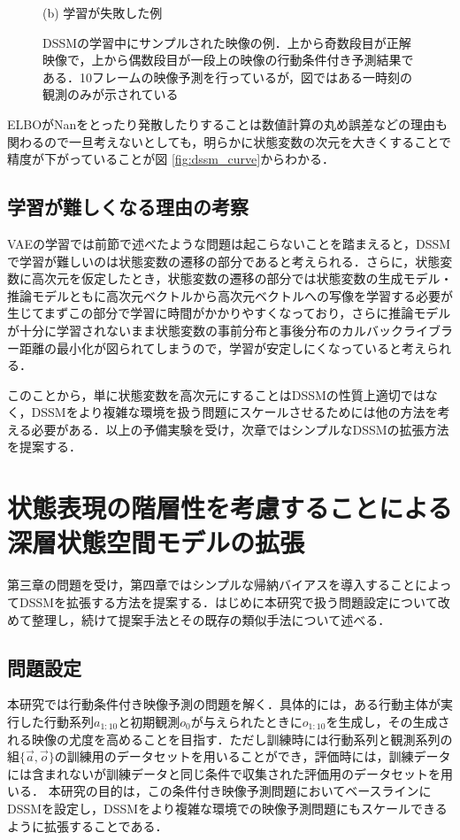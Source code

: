 \documentclass[10pt, twocolumn]{jarticle}
\begin{document}
\begin{figure}[tp]
\begin{minipage}{0.48\hsize}
\begin{center}
      \caption{(b) 学習が失敗した例}
    \end{center}
  \end{minipage}
  \label{fig:dssm_base}
  \caption[DSSMの学習中にサンプルされた映像の例]{DSSMの学習中にサンプルされた映像の例．上から奇数段目が正解映像で，上から偶数段目が一段上の映像の行動条件付き予測結果である．10フレームの映像予測を行っているが，図ではある一時刻の観測のみが示されている}
\end{figure}

ELBOがNanをとったり発散したりすることは数値計算の丸め誤差などの理由も関わるので一旦考えないとしても，明らかに状態変数の次元を大きくすることで精度が下がっていることが図 \ref{fig:dssm_curve}からわかる．

\subsection{学習が難しくなる理由の考察}
VAEの学習では前節で述べたような問題は起こらないことを踏まえると，DSSMで学習が難しいのは状態変数の遷移の部分であると考えられる．さらに，状態変数に高次元を仮定したとき，状態変数の遷移の部分では状態変数の生成モデル・推論モデルともに高次元ベクトルから高次元ベクトルへの写像を学習する必要が生じてまずこの部分で学習に時間がかかりやすくなっており，さらに推論モデルが十分に学習されないまま状態変数の事前分布と事後分布のカルバックライブラー距離の最小化が図られてしまうので，学習が安定しにくなっていると考えられる．

このことから，単に状態変数を高次元にすることはDSSMの性質上適切ではなく，DSSMをより複雑な環境を扱う問題にスケールさせるためには他の方法を考える必要がある．以上の予備実験を受け，次章ではシンプルなDSSMの拡張方法を提案する．

\section{状態表現の階層性を考慮することによる深層状態空間モデルの拡張}
\label{chap:proposal}

第三章の問題を受け，第四章ではシンプルな帰納バイアスを導入することによってDSSMを拡張する方法を提案する．はじめに本研究で扱う問題設定について改めて整理し，続けて提案手法とその既存の類似手法について述べる．

\subsection{問題設定}

本研究では行動条件付き映像予測の問題を解く．具体的には，ある行動主体が実行した行動系列$a_{1:10}$と初期観測$o_0$が与えられたときに$o_{1:10}$を生成し，その生成される映像の尤度を高めることを目指す．ただし訓練時には行動系列と観測系列の組$\{\vec{a}, \vec{o}\}$の訓練用のデータセットを用いることができ，評価時には，訓練データには含まれないが訓練データと同じ条件で収集された評価用のデータセットを用いる．
本研究の目的は，この条件付き映像予測問題においてベースラインにDSSMを設定し，DSSMをより複雑な環境での映像予測問題にもスケールできるように拡張することである．
\end{document}
